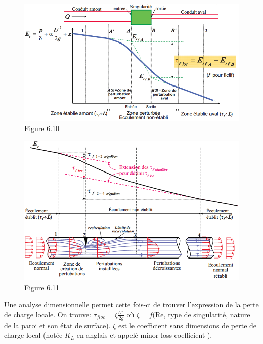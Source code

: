 \begin{minipage}{0.49\textwidth}
\begin{figure}[H]
\begin{center}
\includegraphics[scale=0.3]{ch6/71.png}
\caption*{Figure 6.10}
\end{center}
\end{figure}
\end{minipage}
\begin{minipage}{0.49\textwidth}
\begin{figure}[H]
\begin{center}
\includegraphics[scale=0.25]{ch6/72.png}
\caption*{Figure 6.11}
\end{center}
\end{figure}
\end{minipage}

Une analyse dimensionnelle permet cette fois-ci de trouver l'expression de la perte de charge locale. On trouve: $\tau_{floc}=\zeta \frac{U^2}{2g}$ où $\zeta=f$(Re, type de singularité, nature de la paroi et son état de surface).  $\zeta$ est le coefficient sans dimensions de perte de charge local (notée $K_L$ en anglais et appelé \og minor loss coefficient \fg{}).
\\

